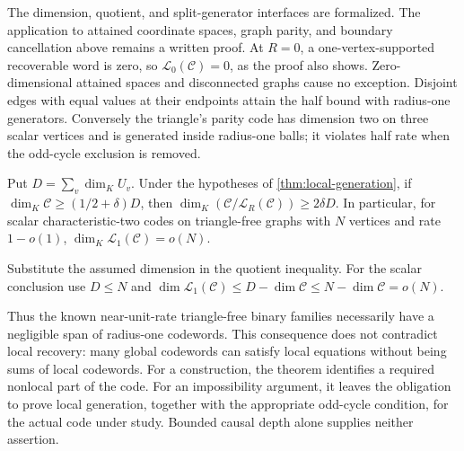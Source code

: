 The dimension, quotient, and split-generator interfaces are formalized.
The application to attained coordinate spaces, graph parity, and
boundary cancellation above remains a written proof.
At $R=0$, a one-vertex-supported recoverable word is zero, so
$\mathcal L_0(\mathcal C)=0$, as the proof also shows.
Zero-dimensional attained spaces and disconnected graphs cause no
exception. Disjoint edges with equal values at their endpoints
attain the half bound with radius-one generators. Conversely the
triangle's parity code has dimension two on three scalar vertices
and is generated inside radius-one balls; it violates half rate
when the odd-cycle exclusion is removed.

\begin{corollary}
\label{cor:nonlocal}
\notformalized
Put $D=\sum_v\dim_K U_v$. Under the hypotheses of
\cref{thm:local-generation}, if $\dim_K\mathcal C\ge(1/2+\delta)D$,
then $\dim_K(\mathcal C/\mathcal L_R(\mathcal C))\ge2\delta D$.
In particular, for scalar characteristic-two codes on triangle-free
graphs with $N$ vertices and rate $1-o(1)$,
$\dim_K\mathcal L_1(\mathcal C)=o(N)$.
\end{corollary}
\begin{informalproof}
Substitute the assumed dimension in the quotient inequality.
For the scalar conclusion use $D\le N$ and
$\dim\mathcal L_1(\mathcal C)\le D-\dim\mathcal C
\le N-\dim\mathcal C=o(N)$.
\end{informalproof}

Thus the known near-unit-rate triangle-free binary families
\cite{BargSchwartzYohananov,Zabokritskiy} necessarily have a
negligible span of radius-one codewords. This consequence does not
contradict local recovery: many global codewords can satisfy local
equations without being sums of local codewords. For a construction,
the theorem identifies a required nonlocal part of the code. For an
impossibility argument, it leaves the obligation to prove local
generation, together with the appropriate odd-cycle condition, for
the actual code under study. Bounded causal depth alone supplies
neither assertion.
